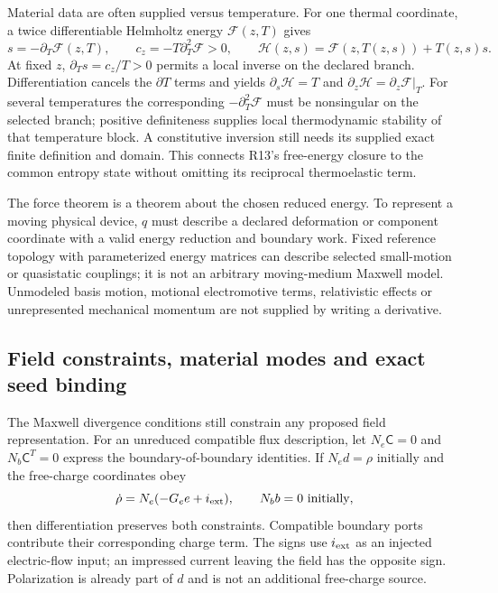 Material data are often supplied versus temperature. For one thermal
coordinate, a twice differentiable Helmholtz energy $\mathcal F(z,T)$ gives
\begin{equation}
 s=-\partial_T\mathcal F(z,T),\qquad
 c_z=-T\partial_T^2\mathcal F>0,\qquad
 \mathcal H(z,s)=\mathcal F(z,T(z,s))+T(z,s)s.
 \label{eq:r14-legendre}
\end{equation}
At fixed $z$, $\partial_Ts=c_z/T>0$ permits a local inverse on the declared
branch. Differentiation cancels the $\partial T$ terms and yields
$\partial_s\mathcal H=T$ and
$\partial_z\mathcal H=\partial_z\mathcal F|_T$. For several temperatures the
corresponding $-\partial_T^2\mathcal F$ must be nonsingular on the selected
branch; positive definiteness supplies local thermodynamic stability of that
temperature block. A constitutive inversion still needs its supplied exact
finite definition and domain. This connects R13's free-energy closure to the
common entropy state without omitting its reciprocal thermoelastic term.

The force theorem is a theorem about the chosen reduced energy. To represent
a moving physical device, $q$ must describe a declared deformation or component
coordinate with a valid energy reduction and boundary work. Fixed reference
topology with parameterized energy matrices can describe selected small-motion
or quasistatic couplings; it is not an arbitrary moving-medium Maxwell model.
Unmodeled basis motion, motional electromotive terms, relativistic effects or
unrepresented mechanical momentum are not supplied by writing a derivative.

\subsection{Field constraints, material modes and exact seed binding}
The Maxwell divergence conditions still constrain any proposed field
representation. For an unreduced compatible flux description, let
$N_e\mathsf C=0$ and $N_b\mathsf C^T=0$ express the boundary-of-boundary
identities. If $N_ed=\rho$ initially and the free-charge coordinates obey
\begin{equation}
 \dot\rho=N_e(-G_e e+i_{\rm ext}),\qquad N_bb=0\ \hbox{initially},
 \label{eq:r14-charge-compatible}
\end{equation}
then differentiation preserves both constraints. Compatible boundary ports
contribute their corresponding charge term. The signs use
$i_{\rm ext}$ as an injected electric-flow input; an impressed current leaving
the field has the opposite sign. Polarization is already part of $d$ and is
not an additional free-charge source.

